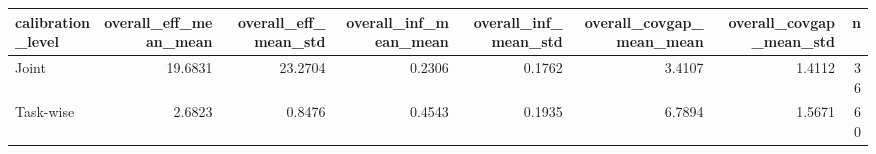 \begin{tabular}{lrrrrrrr}
\toprule
calibration_level & overall_eff_mean_mean & overall_eff_mean_std & overall_inf_mean_mean & overall_inf_mean_std & overall_covgap_mean_mean & overall_covgap_mean_std & n \\
\midrule
Joint & 19.6831 & 23.2704 & 0.2306 & 0.1762 & 3.4107 & 1.4112 & 36 \\
Task-wise & 2.6823 & 0.8476 & 0.4543 & 0.1935 & 6.7894 & 1.5671 & 60 \\
\bottomrule
\end{tabular}
